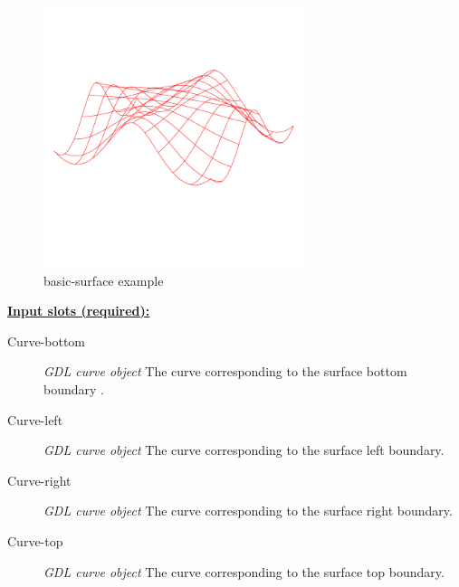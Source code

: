 \documentclass [11pt]{book}
\begin{document}
\begin{itemize}
\begin{figure}
\begin{center}
\includegraphics[width=3in,height=3in]{../images/example-basic-surface.pdf}
\end{center}

\caption{basic-surface example}

\label{fig:basic-surface}

\end{figure}





\textbf{
\underline{Input slots (required):}}

\begin{description}

\item [Curve-bottom]
\emph{GDL curve object} The curve corresponding to the surface bottom boundary .


\item [Curve-left]
\emph{GDL curve object} The curve corresponding to the surface left boundary.


\item [Curve-right]
\emph{GDL curve object} The curve corresponding to the surface right boundary.


\item [Curve-top]
\emph{GDL curve object} The curve corresponding to the surface top boundary.


\end{description}








\end{itemize}
\end{document}

